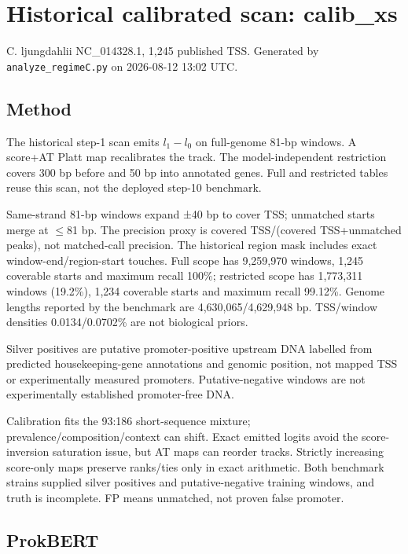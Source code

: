 \documentclass[10pt]{article}
\begin{document}
\section{Historical calibrated scan: calib\_xs}\label{historical-calibrated-scan-calib_xs}

C. ljungdahlii NC\_014328.1, 1,245 published TSS. Generated by \texttt{analyze\_regimeC.py} on 2026-08-12 13:02 UTC.

\subsection{Method}\label{method}

The historical step-1 scan emits \(l_1-l_0\) on full-genome 81-bp windows. A score+AT Platt map recalibrates the track. The model-independent restriction covers 300 bp before and 50 bp into annotated genes. Full and restricted tables reuse this scan, not the deployed step-10 benchmark.

Same-strand 81-bp windows expand ±40 bp to cover TSS; unmatched starts merge at \ensuremath{\leq}81 bp. The precision proxy is covered TSS/(covered TSS+unmatched peaks), not matched-call precision. The historical region mask includes exact window-end/region-start touches. Full scope has 9,259,970 windows, 1,245 coverable starts and maximum recall 100\%; restricted scope has 1,773,311 windows (19.2\%), 1,234 coverable starts and maximum recall 99.12\%. Genome lengths reported by the benchmark are 4,630,065/4,629,948 bp. TSS/window densities 0.0134/0.0702\% are not biological priors.

Silver positives are putative promoter-positive upstream DNA labelled from predicted housekeeping-gene annotations and genomic position, not mapped TSS or experimentally measured promoters. Putative-negative windows are not experimentally established promoter-free DNA.

Calibration fits the 93:186 short-sequence mixture; prevalence/composition/context can shift. Exact emitted logits avoid the score-inversion saturation issue, but AT maps can reorder tracks. Strictly increasing score-only maps preserve ranks/ties only in exact arithmetic. Both benchmark strains supplied silver positives and putative-negative training windows, and truth is incomplete. FP means unmatched, not proven false promoter.

\subsection{ProkBERT}\label{prokbert}
\end{document}
